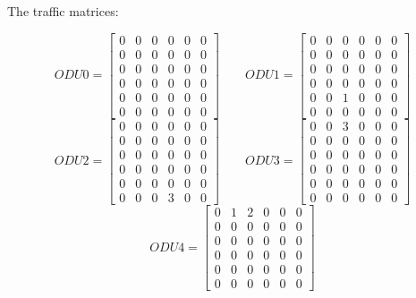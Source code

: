 The traffic matrices:

\[
ODU0=
	\begin{bmatrix}
		0 & 0 & 0 & 0 & 0 & 0 \\
		0 & 0 & 0 & 0 & 0 & 0 \\
		0 & 0 & 0 & 0 & 0 & 0 \\
		0 & 0 & 0 & 0 & 0 & 0 \\
		0 & 0 & 0 & 0 & 0 & 0 \\
		0 & 0 & 0 & 0 & 0 & 0
	\end{bmatrix}
\qquad ODU1=
	\begin{bmatrix}
		0 & 0 & 0 & 0 & 0 & 0 \\
		0 & 0 & 0 & 0 & 0 & 0 \\
		0 & 0 & 0 & 0 & 0 & 0 \\
		0 & 0 & 0 & 0 & 0 & 0 \\
		0 & 0 & 1 & 0 & 0 & 0 \\
		0 & 0 & 0 & 0 & 0 & 0
	\end{bmatrix}
\]
\[
ODU2=
	\begin{bmatrix}
		0 & 0 & 0 & 0 & 0 & 0 \\
		0 & 0 & 0 & 0 & 0 & 0 \\
		0 & 0 & 0 & 0 & 0 & 0 \\
		0 & 0 & 0 & 0 & 0 & 0 \\
		0 & 0 & 0 & 0 & 0 & 0 \\
		0 & 0 & 0 & 3 & 0 & 0
	\end{bmatrix}
\qquad ODU3=
	\begin{bmatrix}
		0 & 0 & 3 & 0 & 0 & 0 \\
		0 & 0 & 0 & 0 & 0 & 0 \\
		0 & 0 & 0 & 0 & 0 & 0 \\
		0 & 0 & 0 & 0 & 0 & 0 \\
		0 & 0 & 0 & 0 & 0 & 0 \\
		0 & 0 & 0 & 0 & 0 & 0
	\end{bmatrix}
\]
\[
ODU4=
	\begin{bmatrix}
		0 & 1 & 2 & 0 & 0 & 0 \\
		0 & 0 & 0 & 0 & 0 & 0 \\
		0 & 0 & 0 & 0 & 0 & 0 \\
		0 & 0 & 0 & 0 & 0 & 0 \\
		0 & 0 & 0 & 0 & 0 & 0 \\
		0 & 0 & 0 & 0 & 0 & 0
	\end{bmatrix}
\]

